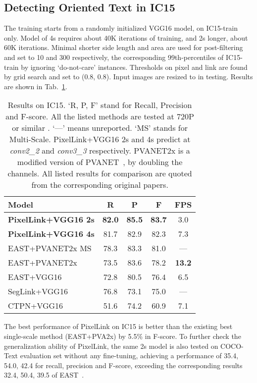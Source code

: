 \documentclass[letterpaper]{article} \usepackage{aaai18}  \usepackage{times}  \usepackage{helvet}  \usepackage{courier}  \usepackage{url}  \usepackage{graphicx}
\begin{document}
	\subsection{Detecting Oriented Text in IC15}
	\label{sec:results-on-ic15}
	The training starts from a randomly initialized VGG16 model, on IC15-train only. Model of 4s requires about 40K iterations of training, and 2s longer, about 60K iterations. Minimal shorter side length and area are used for post-filtering and set to 10 and 300 respectively, the corresponding 99th-percentiles of IC15-train by ignoring `do-not-care' instances. Thresholds on pixel and link are found by grid search and set to (0.8, 0.8). Input images are resized to  in testing. Results are shown in \mbox{Tab.~\ref{table:results-on-ic15}}.
	\begin{table}
		\centering
		\caption{Results on IC15.
			`R, P, F' stand for Recall, Precision and F-score. All the listed methods are tested at 720P or similar . `---' means unreported. `MS' stands for Multi-Scale. PixelLink+VGG16 2s and 4s predict at \emph{conv2\_2} and  \emph{conv3\_3} respectively. PVANET2x is a modified version of PVANET~\cite{kim2016pvanet}, by doubling the channels. All listed results for comparison are quoted from the corresponding original papers.}
		\label{table:results-on-ic15}
		\begin{tabular}{|l|c|c|c|c|}
			\hline
			Model                   &R      &P      &F      &FPS\\
			\hline
			\hline
			\textbf{PixelLink+VGG16 2s}     &\textbf{82.0}  &\textbf{85.5}  &\textbf{83.7}  &3.0\\
			\hline
			\textbf{PixelLink+VGG16 4s}      &81.7   &82.9  &82.3   &7.3\\
			\hline
			EAST+PVANET2x MS       &78.3   &83.3  &81.0   &---\\
			\hline
			EAST+PVANET2x           &73.5   &83.6  &78.2   &\textbf{13.2}\\
			\hline
			EAST+VGG16              &72.8   &80.5  &76.4   &6.5\\
			\hline
			SegLink+VGG16           &76.8   &73.1  &75.0   &---\\
			\hline
			CTPN+VGG16              &51.6   &74.2  &60.9   &7.1\\
			\hline
		\end{tabular}
	\end{table}
	
	The best performance of PixelLink on IC15 is better than the existing best single-scale method (EAST+PVA2x) by 5.5\% in F-score. To further check the generalization ability of PixelLink, the same 2s model is also tested on COCO-Text evaluation set without any fine-tuning, achieving a performance of 35.4, 54.0, 42.4 for recall, precision and F-score, exceeding the corresponding results 32.4, 50.4, 39.5 of EAST~\cite{Zhou2017EAST}.
	
\end{document}
